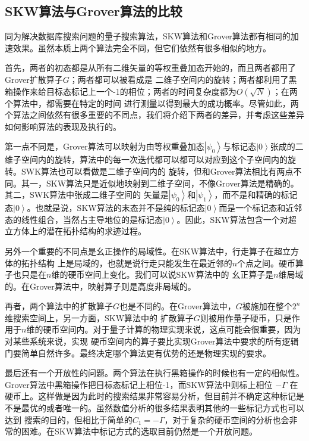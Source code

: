 \subsection{SKW算法与Grover算法的比较}

同为解决数据库搜索问题的量子搜索算法，SKW算法和Grover算法都有相同的加速效果。虽然本质上两个算法完全不同，但它们依然有很多相似的地方。

首先，两者的初态都是从所有二维矢量的等权重叠加态开始的，而且两者都用了Grover扩散算子$G$；两者都可以被看成是
二维子空间内的旋转；两者都利用了黑箱操作来给目标态标记上一个-1的相位；两者的时间复杂度都为$O(\sqrt{N})$；在两个算法中，都需要在特定的时间
进行测量以得到最大的成功概率。尽管如此，两个算法之间依然有很多重要的不同点，我们将介绍下两者的差异，并考虑这些差异如何影响算法的表现及执行的。

第一点不同是，Grover算法可以映射为由等权重叠加态$\left\vert \psi_{0} \right \rangle$与标记态$\left\vert 0 \right \rangle$张成的二维子空间内的旋转，算法中的每一次迭代都可以都可以对应到这个子空间内的旋转。SWK算法也可以看做是二维子空间内的
旋转，但和Grover算法相比有两点不同。其一，SKW算法只是近似地映射到二维子空间，不像Grover算法是精确的。其二，SWK算法中张成二维子空间的
矢量是$\left\vert \psi_{0} \right \rangle$和$\left\vert \psi_{1} \right \rangle$，而不是和精确的标记态$\left\vert 0 \right \rangle$。也就是说，SKW算法的末态并不是纯的标记态$\left\vert 0 \right \rangle$而是一个标记态和近邻态的线性组合，当然占主导地位的是标记态$\left\vert 0 \right \rangle$。因此，SKW算法包含一个对超立方体上的潜在拓扑结构的求迹过程。

另外一个重要的不同点是幺正操作的局域性。在SKW算法中，行走算子在超立方体的拓扑结构 上是局域的，也就是说行走只能发生在最近邻的$n$个点之间。硬币算子也只是在$n$维的硬币空间上变化。我们可以说SKW算法中的
幺正算子是$n$维局域的。在Grover算法中，映射算子则是高度非局域的。

再者，两个算法中的扩散算子$G$也是不同的。在Grover算法中，$G$被施加在整个$2^n$维搜索空间上，另一方面，SKW算法中的
扩散算子$G$则被用作量子硬币，只是作用于$n$维的硬币空间内。对于量子计算的物理实现来说，这点可能会很重要，因为对某些系统来说，实现
硬币空间内的算子要比实现Grover算法中要求的所有逻辑门要简单自然许多。最终决定哪个算法更有优势的还是物理实现的要求。

最后还有一个开放性的问题。两个算法在执行黑箱操作的时候也有一定的相似性。Grover算法中黑箱操作把目标态标记上相位-1，而SKW算法中则标上相位
$-\Gamma$ 在硬币上。这样做是因为此时的搜索结果非常容易分析，但目前并不确定这种标记是不是最优的或者唯一的。虽然数值分析的很多结果表明其他的一些标记方式也可以达到
搜索的目的，但相比于简单的$C_1 = -\Gamma$，对于复杂的硬币空间的分析也会非常的困难。在SKW算法中标记方式的选取目前仍然是一个开放问题。

